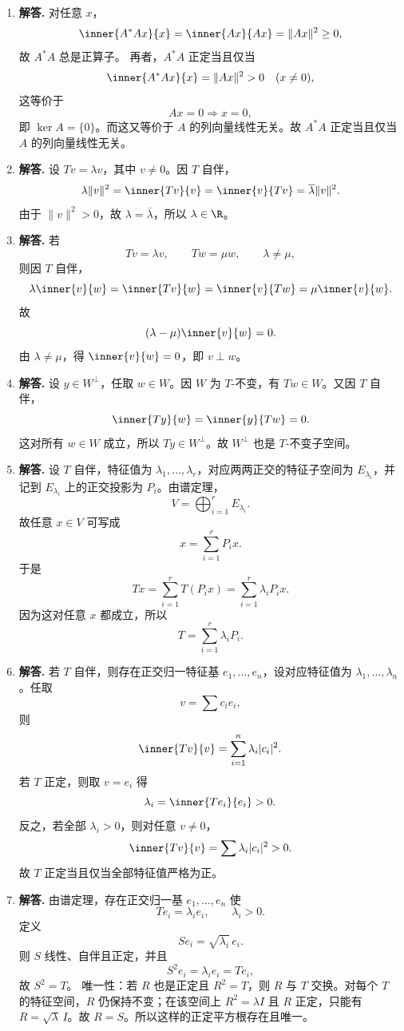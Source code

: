 \begin{enumerate}[label=\textbf{\arabic*.}, leftmargin=*, itemsep=1em]
\item \textbf{解答.} 对任意 $x$，
\[
\inner{A^*Ax}{x}=\inner{Ax}{Ax}=\|Ax\|^2\ge 0,
\]
故 $A^*A$ 总是正算子。  
再者，$A^*A$ 正定当且仅当
\[
\inner{A^*Ax}{x}=\|Ax\|^2>0\quad (x\ne 0),
\]
这等价于
\[
Ax=0\Rightarrow x=0,
\]
即 $\ker A=\{0\}$。而这又等价于 $A$ 的列向量线性无关。故 $A^*A$ 正定当且仅当 $A$ 的列向量线性无关。

\item \textbf{解答.} 设 $Tv=\lambda v$，其中 $v\ne 0$。因 $T$ 自伴，
\[
\lambda\|v\|^2=\inner{Tv}{v}=\inner{v}{Tv}=\overline{\lambda}\|v\|^2.
\]
由于 $\|v\|^2>0$，故 $\lambda=\overline{\lambda}$，所以 $\lambda\in\R$。

\item \textbf{解答.} 若
\[
Tv=\lambda v,\qquad Tw=\mu w,\qquad \lambda\ne \mu,
\]
则因 $T$ 自伴，
\[
\lambda\inner{v}{w}=\inner{Tv}{w}=\inner{v}{Tw}=\mu\inner{v}{w}.
\]
故
\[
(\lambda-\mu)\inner{v}{w}=0.
\]
由 $\lambda\ne\mu$，得 $\inner{v}{w}=0$，即 $v\perp w$。

\item \textbf{解答.} 设 $y\in W^\perp$，任取 $w\in W$。因 $W$ 为 $T$-不变，有 $Tw\in W$。又因 $T$ 自伴，
\[
\inner{Ty}{w}=\inner{y}{Tw}=0.
\]
这对所有 $w\in W$ 成立，所以 $Ty\in W^\perp$。故 $W^\perp$ 也是 $T$-不变子空间。

\item \textbf{解答.} 设 $T$ 自伴，特征值为 $\lambda_1,\dots,\lambda_r$，对应两两正交的特征子空间为 $E_{\lambda_i}$，并记到 $E_{\lambda_i}$ 上的正交投影为 $P_i$。由谱定理，
\[
V=\bigoplus_{i=1}^r E_{\lambda_i}.
\]
故任意 $x\in V$ 可写成
\[
x=\sum_{i=1}^r P_i x.
\]
于是
\[
Tx=\sum_{i=1}^r T(P_i x)=\sum_{i=1}^r \lambda_i P_i x.
\]
因为这对任意 $x$ 都成立，所以
\[
T=\sum_{i=1}^r \lambda_i P_i.
\]

\item \textbf{解答.} 若 $T$ 自伴，则存在正交归一特征基 $e_1,\dots,e_n$，设对应特征值为 $\lambda_1,\dots,\lambda_n$。任取
\[
v=\sum c_i e_i,
\]
则
\[
\inner{Tv}{v}=\sum_{i=1}^n \lambda_i |c_i|^2.
\]
若 $T$ 正定，则取 $v=e_i$ 得
\[
\lambda_i=\inner{Te_i}{e_i}>0.
\]
反之，若全部 $\lambda_i>0$，则对任意 $v\ne 0$，
\[
\inner{Tv}{v}=\sum \lambda_i |c_i|^2>0.
\]
故 $T$ 正定当且仅当全部特征值严格为正。

\item \textbf{解答.} 由谱定理，存在正交归一基 $e_1,\dots,e_n$ 使
\[
Te_i=\lambda_i e_i,\qquad \lambda_i>0.
\]
定义
\[
Se_i=\sqrt{\lambda_i}\,e_i.
\]
则 $S$ 线性、自伴且正定，并且
\[
S^2e_i=\lambda_i e_i=Te_i,
\]
故 $S^2=T$。  
唯一性：若 $R$ 也是正定且 $R^2=T$，则 $R$ 与 $T$ 交换。对每个 $T$ 的特征空间，$R$ 仍保持不变；在该空间上 $R^2=\lambda I$ 且 $R$ 正定，只能有 $R=\sqrt\lambda\,I$。故 $R=S$。所以这样的正定平方根存在且唯一。


\end{enumerate}

